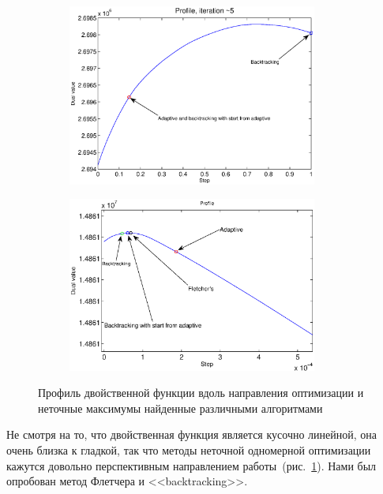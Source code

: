 \documentclass{article}
\begin{document}
\begin{figure}
    \centering
    \begin{subfigure}[t]{\textwidth}
            \centering
            \includegraphics[width=0.9\textwidth]{profile_tsukuba.eps}
    \end{subfigure}
    \begin{subfigure}[t]{\textwidth}
            \centering
            \includegraphics[width=0.9\textwidth]{profile_cones.eps}
    \end{subfigure}
    \caption{Профиль двойственной функции вдоль направления оптимизации и неточные максимумы найденные различными алгоритмами}
    \label{fig:profile}
\end{figure}
Не смотря на то, что двойственная функция является кусочно линейной, она очень близка к гладкой, так что методы неточной одномерной оптимизации кажутся довольно перспективным направлением работы~(рис.~\ref{fig:profile}). Нами был опробован метод Флетчера и <<backtracking>>.\\
\end{document}
